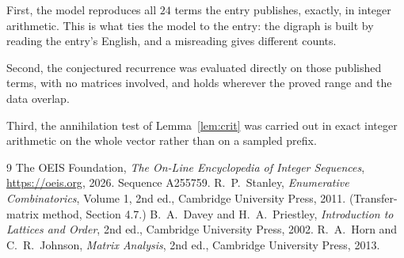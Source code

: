 \documentclass[11pt,a4paper]{article}
\theoremstyle{plain}
\theoremstyle{definition}
\begin{document}
First, the model reproduces all $24$ terms the entry publishes, exactly, in integer
arithmetic. This is what ties the model to the entry: the digraph is built by reading the
entry's English, and a misreading gives different counts.

Second, the conjectured recurrence was evaluated directly on those published terms, with no
matrices involved, and holds wherever the proved range and the data overlap.

Third, the annihilation test of Lemma~\ref{lem:crit} was carried out in exact integer
arithmetic on the whole vector rather than on a sampled prefix.

\begin{thebibliography}{9}
 The OEIS Foundation, \emph{The On-Line Encyclopedia of Integer
Sequences}, \url{https://oeis.org}, 2026. Sequence A255759.
 R.~P.~Stanley, \emph{Enumerative Combinatorics}, Volume 1, 2nd ed.,
Cambridge University Press, 2011. (Transfer-matrix method, Section 4.7.)
 B.~A.~Davey and H.~A.~Priestley, \emph{Introduction to Lattices and
Order}, 2nd ed., Cambridge University Press, 2002.
 R.~A.~Horn and C.~R.~Johnson, \emph{Matrix Analysis}, 2nd ed., Cambridge
University Press, 2013.
\end{thebibliography}
\end{document}
